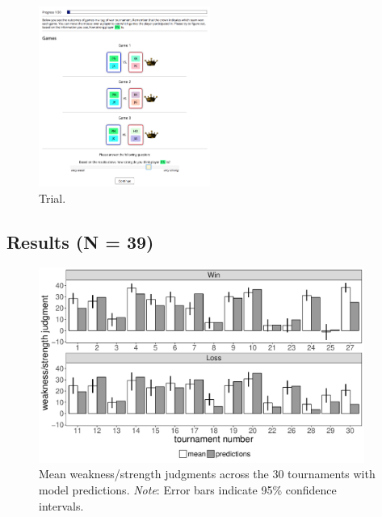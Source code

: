 \documentclass[11pt]{article}
\begin{document}
\begin{figure}[H]
	\centering
	\includegraphics[width=0.5\textwidth]{exp1_screenshot3}
	\caption{Trial.}
	\label{fig:exp1_screenshot3}
\end{figure}

\subsection{Results (N = 39)}
\label{sub:results}


\begin{figure}[H]
  \centering
  \includegraphics[width=0.95\textwidth]{exp1_data_model_bars}
  \caption{Mean weakness/strength judgments across the 30 tournaments with model predictions. \emph{Note}: Error bars indicate 95\% confidence intervals.}
  \label{fig:exp1_data_model_bars}
\end{figure}
\end{document}
